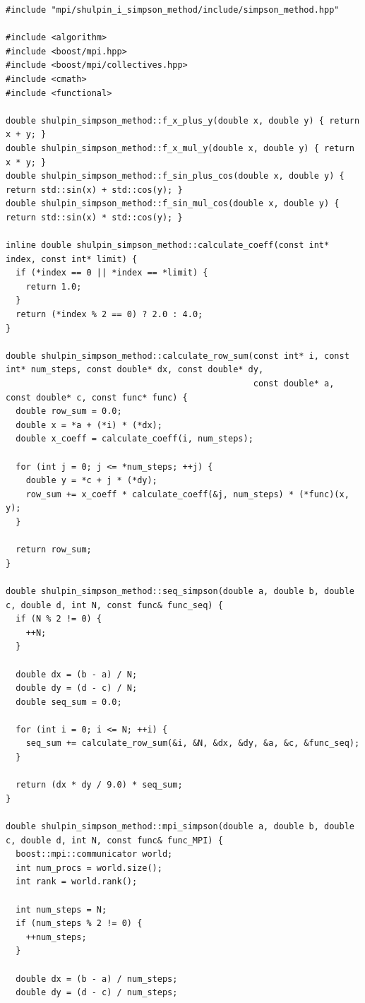 \documentclass[12pt,a4paper]{article}
\begin{document}
\begin{lstlisting}[caption={simpson\_method.cpp}]
#include "mpi/shulpin_i_simpson_method/include/simpson_method.hpp"

#include <algorithm>
#include <boost/mpi.hpp>
#include <boost/mpi/collectives.hpp>
#include <cmath>
#include <functional>

double shulpin_simpson_method::f_x_plus_y(double x, double y) { return x + y; }
double shulpin_simpson_method::f_x_mul_y(double x, double y) { return x * y; }
double shulpin_simpson_method::f_sin_plus_cos(double x, double y) { return std::sin(x) + std::cos(y); }
double shulpin_simpson_method::f_sin_mul_cos(double x, double y) { return std::sin(x) * std::cos(y); }

inline double shulpin_simpson_method::calculate_coeff(const int* index, const int* limit) {
  if (*index == 0 || *index == *limit) {
    return 1.0;
  }
  return (*index % 2 == 0) ? 2.0 : 4.0;
}

double shulpin_simpson_method::calculate_row_sum(const int* i, const int* num_steps, const double* dx, const double* dy,
                                                 const double* a, const double* c, const func* func) {
  double row_sum = 0.0;
  double x = *a + (*i) * (*dx);
  double x_coeff = calculate_coeff(i, num_steps);

  for (int j = 0; j <= *num_steps; ++j) {
    double y = *c + j * (*dy);
    row_sum += x_coeff * calculate_coeff(&j, num_steps) * (*func)(x, y);
  }

  return row_sum;
}

double shulpin_simpson_method::seq_simpson(double a, double b, double c, double d, int N, const func& func_seq) {
  if (N % 2 != 0) {
    ++N;
  }

  double dx = (b - a) / N;
  double dy = (d - c) / N;
  double seq_sum = 0.0;

  for (int i = 0; i <= N; ++i) {
    seq_sum += calculate_row_sum(&i, &N, &dx, &dy, &a, &c, &func_seq);
  }

  return (dx * dy / 9.0) * seq_sum;
}

double shulpin_simpson_method::mpi_simpson(double a, double b, double c, double d, int N, const func& func_MPI) {
  boost::mpi::communicator world;
  int num_procs = world.size();
  int rank = world.rank();

  int num_steps = N;
  if (num_steps % 2 != 0) {
    ++num_steps;
  }

  double dx = (b - a) / num_steps;
  double dy = (d - c) / num_steps;


\end{lstlisting}
\end{document}
